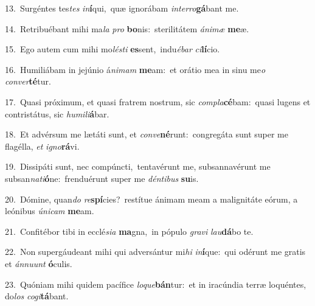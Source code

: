 {\numbfont\textcolor{\numbcolor}{13.}}~Surgéntes tes\textit{tes} \textit{in}\-\textbf{í}qui,~\star quæ ignorábam \textit{in}\-\textit{ter}\textit{ro}\textbf{gá}bant me.\par
{\numbfont\textcolor{\numbcolor}{14.}}~Retribuébant mihi ma\textit{la} \textit{pro} \textbf{bo}\-nis:~\star sterilitátem \textit{á}\-\textit{ni}\textit{mæ} \textbf{me}\-æ.\par
{\numbfont\textcolor{\numbcolor}{15.}}~Ego autem cum mihi mo\-\textit{lés}\-\textit{ti} \textbf{es}\-sent,~\star indu\-\textit{é}\-\textit{bar} \textit{ci}\-\textbf{lí}cio.\par
{\numbfont\textcolor{\numbcolor}{16.}}~Humiliábam in jejúnio á\-\textit{ni}\-\textit{mam} \textbf{me}\-am:~\star et orátio mea in sinu me\textit{o} \textit{con}\-\textit{ver}\textbf{té}tur.\par
{\numbfont\textcolor{\numbcolor}{17.}}~Quasi próximum, et quasi fratrem nostrum, sic \textit{com}\-\textit{pla}\textbf{cé}bam:~\star quasi lugens et contristátus, sic \textit{hu}\-\textit{mi}\textit{li}\textbf{á}bar.\par
{\numbfont\textcolor{\numbcolor}{18.}}~Et advérsum me lætáti sunt, et \textit{con}\-\textit{ve}\textbf{né}runt:~\star congregáta sunt super me flagélla, \textit{et} \textit{i}\-\textit{gno}\textbf{rá}vi.\par
{\numbfont\textcolor{\numbcolor}{19.}}~Dissipáti sunt, nec compúncti,~\dagger tentavérunt me, subsannavérunt me subsan\-\textit{na}\-\textit{ti}\textbf{ó}ne:~\star frenduérunt super me \textit{dén}\-\textit{ti}\textit{bus} \textbf{su}\-is.\par
{\numbfont\textcolor{\numbcolor}{20.}}~Dómine, quan\textit{do} \textit{re}\-\textbf{spí}cies?~\star restítue ánimam meam a malignitáte eórum, a leónibus \textit{ú}\-\textit{ni}\textit{cam} \textbf{me}\-am.\par
{\numbfont\textcolor{\numbcolor}{21.}}~Confitébor tibi in ecclé\-\textit{si}\-\textit{a} \textbf{ma}\-gna,~\star in pópulo \textit{gra}\-\textit{vi} \textit{lau}\-\textbf{dá}bo te.\par
{\numbfont\textcolor{\numbcolor}{22.}}~Non supergáudeant mihi qui adversántur mi\textit{hi} \textit{in}\-\textbf{í}que:~\star qui odérunt me gratis et \textit{án}\-\textit{nu}\textit{unt} \textbf{ó}\-culis.\par
{\numbfont\textcolor{\numbcolor}{23.}}~Quóniam mihi quidem pacífice \textit{lo}\-\textit{que}\textbf{bán}tur:~\star et in iracúndia terræ loquéntes, do\textit{los} \textit{co}\-\textit{gi}\textbf{tá}bant.\par
